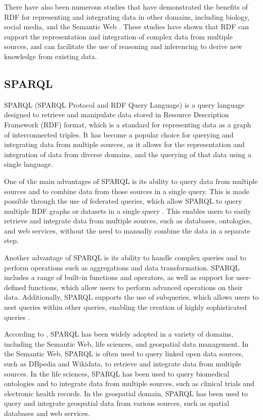 There have also been numerous studies that have demonstrated the benefits of RDF for representing and integrating data in other domains, including biology, social media, and the Semantic Web \citep{schreiber2014rdf}\citep{allemang2011semantic}\citep{heath2011linked}.  These studies have shown that RDF can support the representation and integration of complex data from multiple sources, and can facilitate the use of reasoning and inferencing to derive new knowledge from existing data.

\subsection{SPARQL}

SPARQL (SPARQL Protocol and RDF Query Language) is a query language designed to retrieve and manipulate data stored in Resource Description Framework (RDF) format, which is a standard for representing data as a graph of interconnected triples\citep{prud2008sparql}.  It has become a popular choice for querying and integrating data from multiple sources, as it allows for the representation and integration of data from diverse domains, and the querying of that data using a single language.

One of the main advantages of SPARQL is its ability to query data from multiple sources and to combine data from those sources in a single query.  This is made possible through the use of federated queries, which allow SPARQL to query multiple RDF graphs or datasets in a single query \citep{allemang2011semantic,rakhmawati2013querying}.  This enables users to easily retrieve and integrate data from multiple sources, such as databases, ontologies, and web services, without the need to manually combine the data in a separate step.

Another advantage of SPARQL is its ability to handle complex queries and to perform operations such as aggregations and data transformation.  SPARQL includes a range of built-in functions and operators, as well as support for user-defined functions, which allow users to perform advanced operations on their data.  Additionally, SPARQL supports the use of subqueries, which allows users to nest queries within other queries, enabling the creation of highly sophisticated queries \citep{allemang2011semantic}.

According to \citep{allemang2011semantic}, SPARQL has been widely adopted in a variety of domains, including the Semantic Web, life sciences, and geospatial data management.  In the Semantic Web, SPARQL is often used to query linked open data sources, such as DBpedia and Wikidata, to retrieve and integrate data from multiple sources.  In the life sciences, SPARQL has been used to query biomedical ontologies and to integrate data from multiple sources, such as clinical trials and electronic health records.  In the geospatial domain, SPARQL has been used to query and integrate geospatial data from various sources, such as spatial databases and web services.

